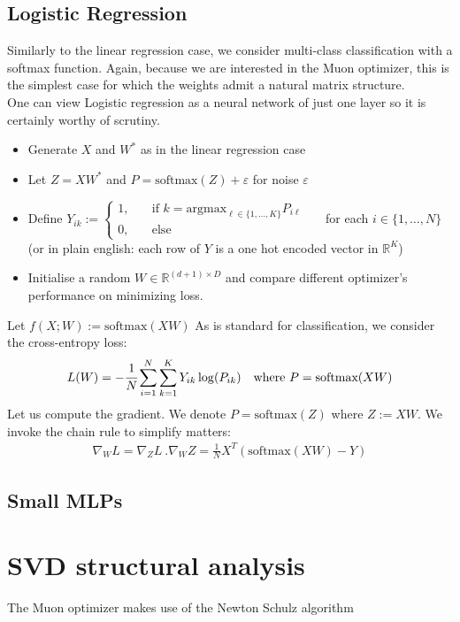 \documentclass[12pt]{book}
\newcommand{\R}{\mathbb{R}}
\begin{document}
\subsection{Logistic Regression}
Similarly to the linear regression case, we consider multi-class classification with a softmax function. Again, because we are interested in the Muon optimizer, this is the simplest case for which the weights admit a natural matrix structure. 
\\
One can view Logistic regression as a neural network of just one layer so it is certainly worthy of scrutiny.  
\begin{itemize}
\item Generate $X$ and  $W^*$ as in the linear regression case
\item  Let $Z = XW^*$ and  $P = \text{softmax}(Z) + \varepsilon $ for noise $\varepsilon $
\item  Define $Y_{ik} := \begin{cases}
		1, \quad &\text{if $k = \text{argmax}_{\ell \in \{1,\ldots,K\} } P_{i\ell} $}\\
		0, &\text{else}
\end{cases}$\ \ \  for each $i \in\{1,\ldots,N\} $ (or in plain english: each row of $Y$ is a one hot encoded vector in $\R^{K}$)
\item Initialise a random $W\in \R^{(d+1) \times D}$ and compare different optimizer's performance on minimizing loss. 
\end{itemize}
Let $f(X ; W) := \text{softmax}(XW)$
As is standard for classification, we consider the cross-entropy loss:
\[
L(W) = - \cfrac{1}{N} \sum_{i = 1}^{N} \sum_{k=1}^{K} {Y_{ik} \log(P_{ik})} \quad \text{where } P = \text{softmax}(XW)
\]
Let us compute the gradient. We denote $P = \text{softmax}(Z)$  where $Z := XW$. We invoke the chain rule to simplify matters: 
\begin{align*}
\nabla_W L = \nabla_Z L\  . \nabla_W Z = \frac{1}{N} X^{T} (\text{softmax}(XW) - Y)
\end{align*}
\subsection{Small MLPs}
\section{SVD structural analysis}
The Muon optimizer makes use of the Newton Schulz algorithm 
\end{document}
